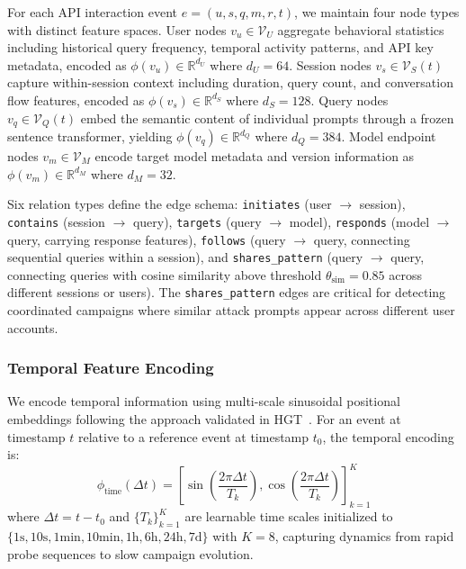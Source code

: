 \documentclass[journal]{IEEEtran}
\newcommand{\R}{\mathbb{R}}
\newcommand{\calV}{\mathcal{V}}
\theoremstyle{plain}
\theoremstyle{definition}
\theoremstyle{remark}
\begin{document}
For each API interaction event $e = (u, s, q, m, r, t)$, we maintain four node types with distinct feature spaces. User nodes $v_u \in \calV_U$ aggregate behavioral statistics including historical query frequency, temporal activity patterns, and API key metadata, encoded as $\phi(v_u) \in \R^{d_U}$ where $d_U = 64$. Session nodes $v_s \in \calV_S(t)$ capture within-session context including duration, query count, and conversation flow features, encoded as $\phi(v_s) \in \R^{d_S}$ where $d_S = 128$. Query nodes $v_q \in \calV_Q(t)$ embed the semantic content of individual prompts through a frozen sentence transformer, yielding $\phi(v_q) \in \R^{d_Q}$ where $d_Q = 384$. Model endpoint nodes $v_m \in \calV_M$ encode target model metadata and version information as $\phi(v_m) \in \R^{d_M}$ where $d_M = 32$.

Six relation types define the edge schema: \texttt{initiates} (user $\to$ session), \texttt{contains} (session $\to$ query), \texttt{targets} (query $\to$ model), \texttt{responds} (model $\to$ query, carrying response features), \texttt{follows} (query $\to$ query, connecting sequential queries within a session), and \texttt{shares\_pattern} (query $\to$ query, connecting queries with cosine similarity above threshold $\theta_{\text{sim}} = 0.85$ across different sessions or users). The \texttt{shares\_pattern} edges are critical for detecting coordinated campaigns where similar attack prompts appear across different user accounts.

\subsubsection{Temporal Feature Encoding}

We encode temporal information using multi-scale sinusoidal positional embeddings following the approach validated in HGT~\cite{hu2020hgt}. For an event at timestamp $t$ relative to a reference event at timestamp $t_0$, the temporal encoding is:
\begin{equation}
\phi_{\text{time}}(\Delta t) = \left[\sin\!\left(\frac{2\pi \Delta t}{T_k}\right), \cos\!\left(\frac{2\pi \Delta t}{T_k}\right)\right]_{k=1}^{K}
\end{equation}
where $\Delta t = t - t_0$ and $\{T_k\}_{k=1}^K$ are learnable time scales initialized to $\{1\text{s}, 10\text{s}, 1\text{min}, 10\text{min}, 1\text{h}, 6\text{h}, 24\text{h}, 7\text{d}\}$ with $K = 8$, capturing dynamics from rapid probe sequences to slow campaign evolution.
\end{document}
